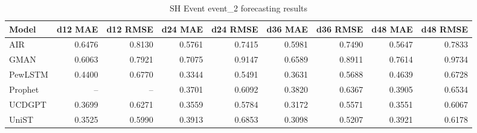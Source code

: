\begin{table}[htbp]
\centering
\small
\caption{SH Event event\_2 forecasting results}
\label{tab:sh-event-event-2}
\begin{tabular}{lrrrrrrrr}
\toprule
Model & d12 MAE & d12 RMSE & d24 MAE & d24 RMSE & d36 MAE & d36 RMSE & d48 MAE & d48 RMSE \\
\midrule
AIR & 0.6476 & 0.8130 & 0.5761 & 0.7415 & 0.5981 & 0.7490 & 0.5647 & 0.7833 \\
GMAN & 0.6063 & 0.7921 & 0.7075 & 0.9147 & 0.6589 & 0.8911 & 0.7614 & 0.9734 \\
PewLSTM & 0.4400 & 0.6770 & 0.3344 & 0.5491 & 0.3631 & 0.5688 & 0.4639 & 0.6728 \\
Prophet & -- & -- & 0.3701 & 0.6092 & 0.3820 & 0.6367 & 0.3905 & 0.6534 \\
UCDGPT & 0.3699 & 0.6271 & 0.3559 & 0.5784 & 0.3172 & 0.5571 & 0.3551 & 0.6067 \\
UniST & 0.3525 & 0.5990 & 0.3913 & 0.6853 & 0.3098 & 0.5207 & 0.3921 & 0.6178 \\
\bottomrule
\end{tabular}
\end{table}

